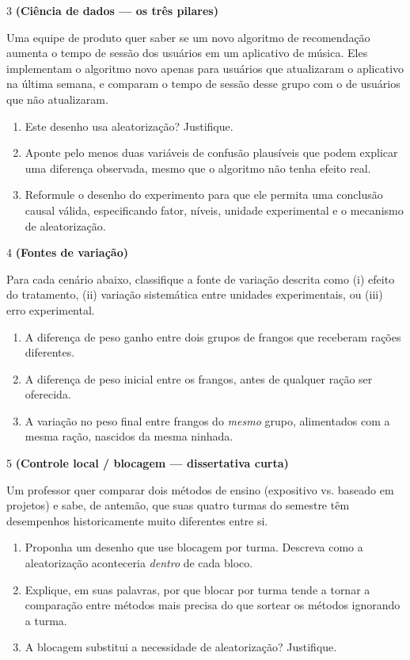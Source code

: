\documentclass[11pt]{article}
\begin{document}
\begin{questao}{3} \textbf{(Ciência de dados --- os três pilares)}

Uma equipe de produto quer saber se um novo algoritmo de recomendação aumenta o tempo de sessão
dos usuários em um aplicativo de música. Eles implementam o algoritmo novo apenas para usuários
que atualizaram o aplicativo na última semana, e comparam o tempo de sessão desse grupo com o de
usuários que não atualizaram.

\begin{enumerate}[label=(\alph*)]
  \item Este desenho usa aleatorização? Justifique.
  \item Aponte pelo menos duas variáveis de confusão plausíveis que podem explicar uma diferença
    observada, mesmo que o algoritmo não tenha efeito real.
  \item Reformule o desenho do experimento para que ele permita uma conclusão causal válida,
    especificando fator, níveis, unidade experimental e o mecanismo de aleatorização.
\end{enumerate}
\end{questao}

\begin{questao}{4} \textbf{(Fontes de variação)}

Para cada cenário abaixo, classifique a fonte de variação descrita como (i) efeito do
tratamento, (ii) variação sistemática entre unidades experimentais, ou (iii) erro experimental.

\begin{enumerate}[label=(\alph*)]
  \item A diferença de peso ganho entre dois grupos de frangos que receberam rações diferentes.
  \item A diferença de peso inicial entre os frangos, antes de qualquer ração ser oferecida.
  \item A variação no peso final entre frangos do \emph{mesmo} grupo, alimentados com a mesma
    ração, nascidos da mesma ninhada.
\end{enumerate}
\end{questao}

\begin{questao}{5} \textbf{(Controle local / blocagem --- dissertativa curta)}

Um professor quer comparar dois métodos de ensino (expositivo vs. baseado em projetos) e sabe,
de antemão, que suas quatro turmas do semestre têm desempenhos historicamente muito diferentes
entre si.

\begin{enumerate}[label=(\alph*)]
  \item Proponha um desenho que use blocagem por turma. Descreva como a aleatorização
    aconteceria \emph{dentro} de cada bloco.
  \item Explique, em suas palavras, por que blocar por turma tende a tornar a comparação entre
    métodos mais precisa do que sortear os métodos ignorando a turma.
  \item A blocagem substitui a necessidade de aleatorização? Justifique.
\end{enumerate}
\end{questao}
\end{document}
